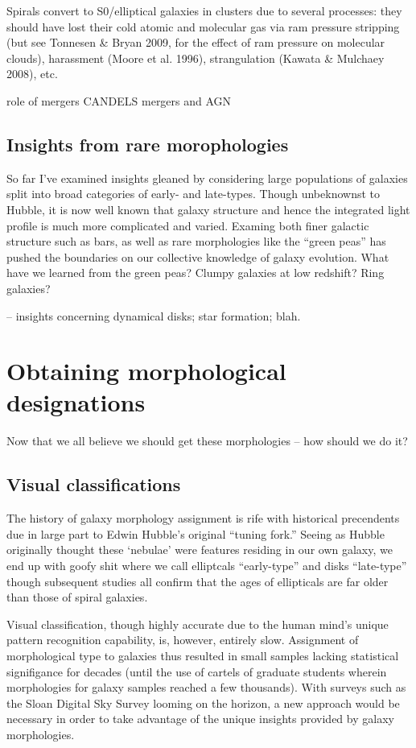 Spirals convert to S0/elliptical galaxies in clusters due to several processes: they should have lost their cold atomic and molecular gas via ram pressure stripping (but see Tonnesen \& Bryan 2009, for the effect of ram
pressure on molecular clouds), harassment (Moore et al. 1996),
strangulation (Kawata \& Mulchaey 2008), etc.


role of mergers CANDELS \citep{Karteltepe2010}
mergers and AGN \citep{Kocevski2012, Villforth2014}

\subsection{Insights from rare morophologies}
So far I've examined insights gleaned by considering large populations of galaxies split into broad categories of early- and late-types. Though unbeknownst to Hubble, it is now well known that galaxy structure and hence the integrated light profile is much more complicated and varied. Examing both finer galactic structure such as bars, as well as rare morphologies like the ``green peas'' has pushed the boundaries on our collective knowledge of galaxy evolution. What have we learned from the green peas? Clumpy galaxies at low redshift? Ring galaxies? 

-- insights concerning dynamical disks; star formation; blah. 


\section{Obtaining morphological designations}
Now that we all believe we should get these morphologies -- how should we do it? 

\subsection{Visual classifications}
The history of galaxy morphology assignment is rife with historical precendents due in large part to Edwin Hubble's original ``tuning fork.'' Seeing as Hubble originally thought these `nebulae' were features residing in our own galaxy, we end up with goofy shit where we call elliptcals ``early-type'' and disks ``late-type'' though subsequent studies all confirm that the ages of ellipticals are far older than those of spiral galaxies. 

Visual classification, though highly accurate due to the human mind's unique pattern recognition capability, is, however, entirely slow. Assignment of morphological type to galaxies thus resulted in small samples lacking statistical signifigance for decades (until the use of cartels of graduate students wherein morphologies for galaxy samples reached a few thousands). With surveys such as the Sloan Digital Sky Survey looming on the horizon, a new approach would be necessary in order to take advantage of the unique insights provided by galaxy morphologies.

